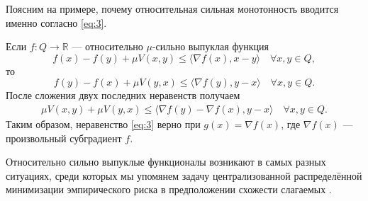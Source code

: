     Поясним на примере, почему относительная сильная монотонность вводится именно согласно  \eqref{eq:3}.
    \begin{example}
        Если $f: Q \longrightarrow \mathbb{R}$ --- относительно $\mu$-сильно выпуклая функция
        \begin{equation}\label{eqrelativestorngconv}
            f(x) - f(y) + \mu V(x, y) \leq \langle \nabla{f(x)}, x - y \rangle \quad   \forall x, y \in Q,
        \end{equation}
        то
        \begin{equation}
            f(y) - f(x) + \mu V(y, x) \leq \langle \nabla{f(y)}, y - x \rangle \quad   \forall x, y \in Q.
        \end{equation}
        После сложения двух последних неравенств получаем
        \begin{align*}
            \mu V(x, y) + \mu V(y, x)\leq \langle \nabla{f(y)} - \nabla{f(x)}, y - x \rangle \quad  \forall x, y \in Q.
        \end{align*}
        Таким образом, неравенство \eqref{eq:3} верно при $g(x) = \nabla{f(x)}$, где $\nabla{f(x)}$ --- произвольный субградиент $f$.
    \end{example}

    Относительно сильно выпуклые функционалы возникают в самых разных ситуациях, среди которых мы упомянем задачу централизованной распределённой минимизации эмпирического риска в предположении схожести слагаемых \cite{Hendr}.

